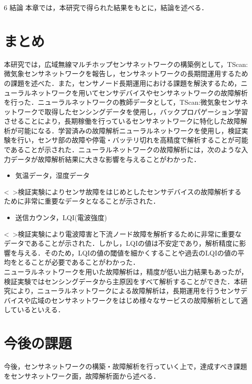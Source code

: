 \chapterhead
{6}
{結論}
{本章では，本研究で得られた結果をもとに，結論を述べる．}

\section{まとめ}
本研究では，広域無線マルチホップセンサネットワークの構築例として，TScan:微気象センサネットワークを報告し，センサネットワークの長期間運用するための課題を述べた．また，センサノード長期運用における課題を解決するため，ニューラルネットワークを用いてセンサデバイスやセンサネットワークの故障解析を行った．ニューラルネットワークの教師データとして，TScan:微気象センサネットワークで取得したセンシングデータを使用し，バックプロパゲーション学習させることにより，長期稼働を行っているセンサネットワークに特化した故障解析が可能になる．学習済みの故障解析ニューラルネットワークを使用し，検証実験を行い，センサ部の故障や停電・バッテリ切れを高精度で解析することが可能であることが示された．ニューラルネットワークの故障解析には，次のような入力データが故障解析結果に大きな影響を与えることがわかった．
\begin{itemize}
\item 気温データ，湿度データ
\end{itemize}
<\ >検証実験によりセンサ故障をはじめとしたセンサデバイスの故障解析するために非常に重要なデータとなることが示された．
\begin{itemize}
\item 送信カウンタ，LQI(電波強度)
\end{itemize}
<\ >検証実験により電波障害と下流ノード故障を解析するために非常に重要なデータであることが示された．しかし，LQIの値は不安定であり，解析精度に影響を与える．そのため，LQIの値の閾値を細かくすることや過去のLQIの値の平均をとることが必要であることがわかった．\\

ニューラルネットワークを用いた故障解析は，精度が低い出力結果もあったが，検証実験ではセンシングデータから主原因をすべて解析することができた．本研究により，ニューラルネットワークによる故障解析は，長期運用を行うセンサデバイスや広域のセンサネットワークをはじめ様々なサービスの故障解析として適しているといえる．

\newpage

\section{今後の課題}
今後，センサネットワークの構築・故障解析を行っていく上で，達成すべき課題をセンサネットワーク面，故障解析面から述べる．
